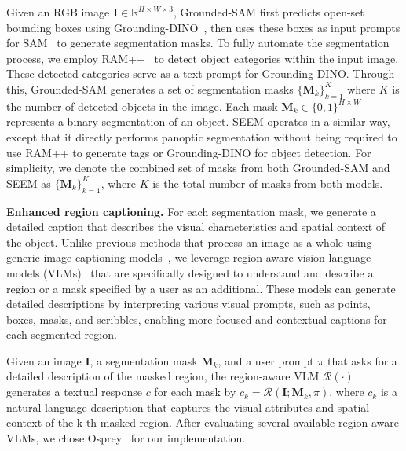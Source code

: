 Given an RGB image $\mathbf{I}\in\mathbb{R}^{H \times W \times 3}$, Grounded-SAM first predicts open-set bounding boxes using Grounding-DINO~\cite{liu2023grounding}, then uses these boxes as input prompts for SAM~\cite{sam,ravi2024sam} to generate segmentation masks.
To fully automate the segmentation process, we employ RAM++~\cite{ram_pp} to detect object categories within the input image.
These detected categories serve as a text prompt for Grounding-DINO.
Through this, Grounded-SAM generates a set of segmentation masks $\{\mathbf{M}_k\}_{k=1}^K$
where $K$ is the number of detected objects in the image.
Each mask $\mathbf{M}_k \in \{0,1\}^{H \times W}$ represents a binary segmentation of an object.
SEEM operates in a similar way, except that it directly performs panoptic segmentation without being required to use RAM++ to generate tags or Grounding-DINO for object detection.
For simplicity, we denote the combined set of masks from both Grounded-SAM and SEEM as $\{\mathbf{M}_k\}_{k=1}^K$, where $K$ is the total number of masks from both models.

\noindent\textbf{Enhanced region captioning.}
For each segmentation mask, we generate a detailed caption that describes the visual characteristics and spatial context of the object.
Unlike previous methods that process an image as a whole using generic image captioning models~\cite{peng2023kosmos,llava,vit-gpt2,wang2022ofa}, we leverage region-aware vision-language models (VLMs)~\cite{you2023ferret,yuan2024osprey,rasheed2024glamm} that are specifically designed to understand and describe a region or a mask specified by a user as an additional. These models can generate detailed descriptions by interpreting various visual prompts, such as points, boxes, masks, and scribbles, enabling more focused and contextual captions for each segmented region.

Given an image $\mathbf{I}$, a segmentation mask $\mathbf{M}_k$, and a user prompt $\pi$ that asks for a detailed description of the masked region, the region-aware VLM $\mathcal{R}(\cdot)$ generates a textual response $c$ for each mask by
$c_k = \mathcal{R}(\mathbf{I}; \mathbf{M}_k, \pi)$,
where $c_k$ is a natural language description that captures the visual attributes and spatial context of the k-th masked region.
After evaluating several available region-aware VLMs, we chose Osprey~\cite{yuan2024osprey} for our implementation.


